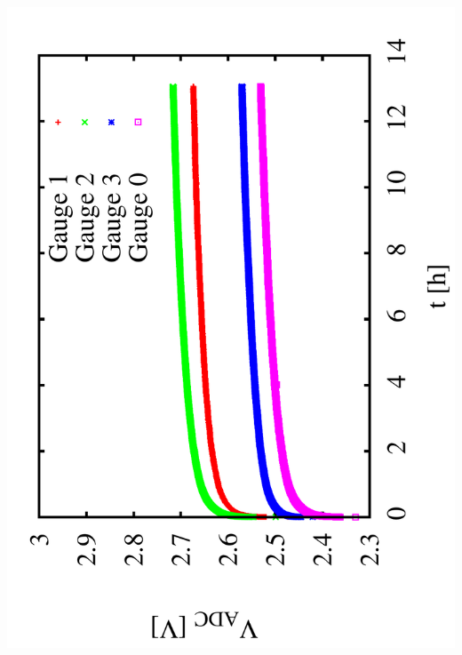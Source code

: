 \documentclass[a4paper,11pt]{book}
\begin{document}
 \includegraphics[angle=-90,scale=0.15]{image_ai_21b.pdf}\\ 
 
\end{document}
